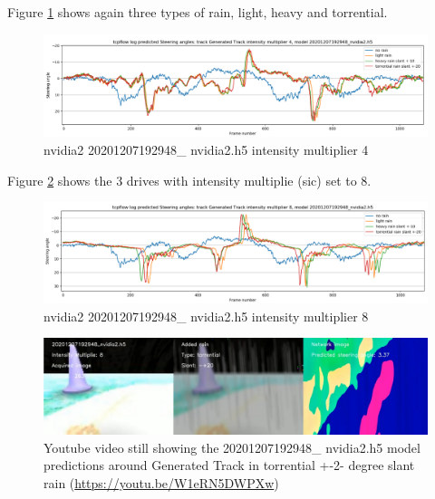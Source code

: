 Figure \ref{fig:sa_GeneratedTrackintensitymultiplier4_20201207192948_nvidia2} shows again three types of rain, light, heavy and torrential.
\begin{figure}[h!]
 \centering 
 \includegraphics[width=\textwidth]{Figures/sa_GeneratedTrackintensitymultiplier4_20201207192948_nvidia2.h5}
 \caption{nvidia2 20201207192948\_ nvidia2.h5 intensity multiplier 4}
 \label{fig:sa_GeneratedTrackintensitymultiplier4_20201207192948_nvidia2} 
\end{figure}

Figure \ref{fig:sa_GeneratedTrackintensitymultiplier8_20201207192948_nvidia2} shows the 3 drives with intensity multiplie (sic) set to 8.
\begin{figure}[h!]
 \centering 
 \includegraphics[width=\textwidth]{Figures/sa_GeneratedTrackintensitymultiplier8_20201207192948_nvidia2.h5}
 \caption{nvidia2 20201207192948\_ nvidia2.h5 intensity multiplier 8}
 \label{fig:sa_GeneratedTrackintensitymultiplier8_20201207192948_nvidia2} 
\end{figure}

\begin{figure}[ht]
 \centering 
 \includegraphics[width=\textwidth]{Figures/youtube20201207192948_nvidia2torrential20mult_8_h5.png}
 \caption{Youtube video still showing the 20201207192948\_ nvidia2.h5 model predictions around Generated Track in torrential +-2- degree slant rain (\url{https://youtu.be/W1eRN5DWPXw})}
 \label{fig:youtube20201207192948_nvidia2torrential20mult_8_h5} 
\end{figure}

